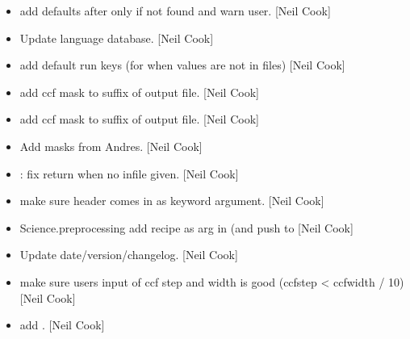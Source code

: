 \documentclass[a4paper,10pt,english]{report}
\begin{document}
\begin{itemize}
\item {} 
 \sphinxhyphen{} add defaults after only if not
found and warn user. {[}Neil Cook{]}

\item {} 
Update language database. {[}Neil Cook{]}

\item {} 
 \sphinxhyphen{} add default run keys (for when
values are not in files) {[}Neil Cook{]}

\item {} 
 \sphinxhyphen{} add ccf mask to suffix of output file.
{[}Neil Cook{]}

\item {} 
 \sphinxhyphen{} add ccf mask to suffix of output file.
{[}Neil Cook{]}

\item {} 
Add masks from Andres. {[}Neil Cook{]}

\item {} 
 \sphinxhyphen{} : fix return when
no infile given. {[}Neil Cook{]}

\item {} 
 \sphinxhyphen{}  make sure header
comes in as keyword argument. {[}Neil Cook{]}

\item {} 
Science.preprocessing \sphinxhyphen{} add recipe as arg in  (and push to
 {[}Neil Cook{]}

\item {} 
Update date/version/changelog. {[}Neil Cook{]}

\item {} 
 \sphinxhyphen{} make sure users input of ccf step and
width is good (ccfstep \textless{} ccfwidth / 10) {[}Neil Cook{]}

\item {} 
 \sphinxhyphen{} add
. {[}Neil Cook{]}

\end{itemize}
\end{document}
